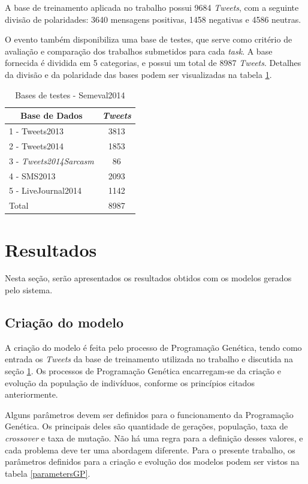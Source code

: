 \documentclass[12pt]{article}
\begin{document}
A base de treinamento aplicada no trabalho possui 9684 \emph{Tweets}, com a seguinte divisão de polaridades: 3640 mensagens positivas, 1458 negativas e 4586 neutras.

O evento também disponibiliza uma base de testes, que serve como critério de avaliação e comparação dos trabalhos submetidos para cada \emph{task}. A base fornecida é dividida em 5 categorias, e possui um total de 8987 \emph{Tweets}. Detalhes da divisão e da polaridade das bases podem ser visualizadas na tabela \ref{datasets}.

\begin{table}[H]
\centering
	\begin{tabular}{lc}
	\multicolumn{1}{c}{\textbf{Base de Dados}} & \textit{\textbf{Tweets}} \\ \hline
	1 - Tweets2013 & 3813 \\ \hline
	2 - Tweets2014 & 1853 \\ \hline
	3 - \textit{Tweets2014Sarcasm} & 86 \\ \hline
	4 - SMS2013 & 2093 \\ \hline
	5 - LiveJournal2014 & 1142 \\ \hline
	Total & 8987
	\end{tabular}
\caption{Bases de testes - Semeval2014}
\label{datasets}
\end{table}

\section{Resultados}

Nesta seção, serão apresentados os resultados obtidos com os modelos gerados pelo sistema. 

\subsection{Criação do modelo}

A criação do modelo é feita pelo processo de Programação Genética, tendo como entrada os \emph{Tweets} da base de treinamento utilizada no trabalho e discutida na seção \ref{datasets}. Os processos de Programação Genética encarregam-se da criação e evolução da população de indivíduos, conforme os princípios citados anteriormente.

Alguns parâmetros devem ser definidos para o funcionamento da Programação Genética. Os principais deles são quantidade de gerações, população, taxa de \emph{crossover} e taxa de mutação. Não há uma regra para a definição desses valores, e cada problema deve ter uma abordagem diferente. Para o presente trabalho, os parâmetros definidos para a criação e evolução dos modelos podem ser vistos na tabela \ref{parametersGP}.
\end{document}
